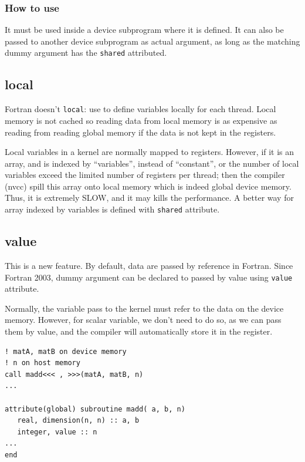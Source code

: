 \subsubsection{How to use}
\label{sec:how-use-3}

It must be used inside a device subprogram where it is defined.  It
can also be passed to another device subprogram as actual argument, as
long as the matching dummy argument has the \verb!shared!  attributed.


\subsection{local}
\label{sec:local}

Fortran doesn't \verb!local!: use to define variables locally for each
thread. Local memory is not cached so reading data from local memory
is as expensive as reading from reading global memory if the data is
not kept in the registers.

Local variables in a kernel are normally mapped to registers. However,
if it is an array, and is indexed by ``variables'', instead of
``constant'', or the number of local variables exceed the limited
number of registers per thread; then the compiler (nvcc) spill this
array onto local memory which is indeed global device memory. Thus, it
is extremely SLOW, and it may kills the performance. A better way for
array indexed by variables is defined with \verb!shared! attribute.

\subsection{value}
\label{sec:value}

This is a new feature. By default, data are passed by reference in
Fortran. Since Fortran 2003, dummy argument can be declared to passed
by value using \verb!value! attribute. 

Normally, the variable pass to the kernel must refer to the data on
the device memory. However, for scalar variable, we don't need to do
so, as we can pass them by value, and the compiler will automatically
store it in the register. 
\begin{lstlisting}
! matA, matB on device memory
! n on host memory
call madd<<< , >>>(matA, matB, n)
...

attribute(global) subroutine madd( a, b, n) 
   real, dimension(n, n) :: a, b
   integer, value :: n
...
end
\end{lstlisting}


